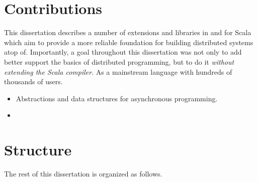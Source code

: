 \section{Contributions}

This dissertation describes a number of extensions and libraries in and for
Scala which aim to provide a more reliable foundation for building distributed
systems atop of. Importantly, a goal throughout this dissertation was not only
to add better support the basics of distributed programming, but to do it {\em
without extending the Scala compiler}. As a mainstream language with hundreds of
thousands of users.

\begin{itemize}

	\item Abstractions and data structures for asynchronous programming.

	\item

\end{itemize}

\section{Structure}

The rest of this dissertation is organized as follows.

